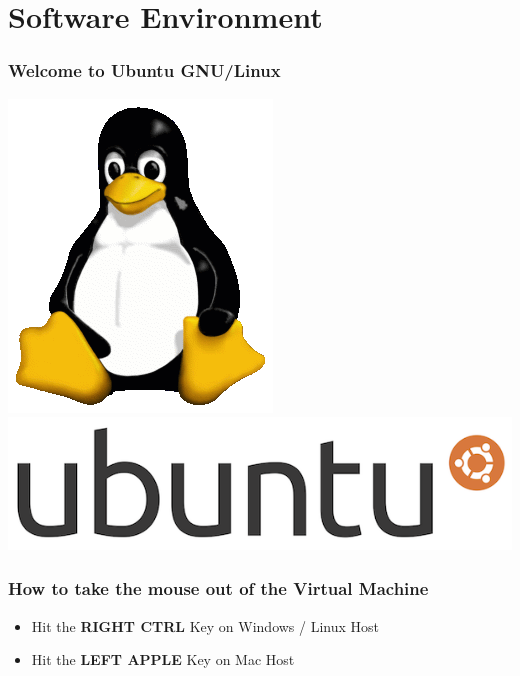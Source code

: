 \section{Software Environment}


\begin{frame}
\frametitle{Welcome to Ubuntu GNU/Linux}
\begin{center}
\includegraphics[height=0.5\paperheight]{../Art/Tux.png}
\includegraphics[width=0.5\paperwidth]{../Art/blackeubuntulogo.png}
\end{center}
\end{frame}

\begin{frame}
\frametitle{How to take the mouse out of the Virtual Machine}
\begin{itemize}
\item Hit the \textbf{RIGHT CTRL} Key on Windows / Linux Host
\item Hit the \textbf{LEFT APPLE} Key on Mac Host
\end{itemize}
\end{frame}

